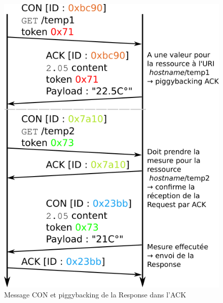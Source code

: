 \documentclass[]{report}
\begin{document}
\begin{figure}[!ht]
	\centering
	\begin{minipage}{0.39\textwidth}
		\centering
		\includegraphics[width=\textwidth]{CoAP_messaging_CON}
		\caption{Message CON et piggybacking de la Response dans l'ACK}
		\label{fig:CoAP_CON}
	\end{minipage}\hfill
	\begin{minipage}{0.59\textwidth}
        \centering
        

\end{minipage}
\end{figure}
\end{document}
